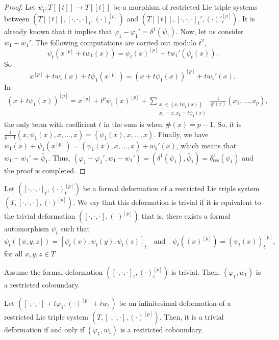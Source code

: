 \documentclass[11pt, twoside]{article}
\begin{document}
\begin{proof}
     Let $\psi_t:T[[t]] \to T[[t]] $ be a morphism of restricted Lie triple systems between $(T[[t]],[\cdot,\cdot,\cdot]_t,(\cdot)^{[p]}_t) $ and $(T[[t]],[\cdot,\cdot,\cdot]_t',(\cdot)'^{[p]}_t ) $. It is already known that it implies that $\varphi_1-\varphi_1'=\delta^1(\psi_1) $. Now, let us consider $w_1-w_1' $. The following computations are carried out modulo $t^2$, $$\psi_t(x^{[p]}+tw_1(x))= \psi_t(x)^{[p]}+tw_1'(\psi_t(x)). $$ So $$x^{[p]}+tw_1(x)+t\psi_1(x^{[p]})= (x+t\psi_1(x))^{[p]}+ tw_1'(x). $$ In \begin{align*}
        (x+t\psi_1(x))^{[p]}= x^{[p]}+ t^p\psi_1(x)^{[p]}+ \sum_{\substack{x_j\in \left\{x,t\psi_1(x) \right\}\\x_1=x,x_2=t\psi_1(x)}}\frac{1}{\#(x)}(x_1,\ldots,x_p),  
    \end{align*} the only term with coefficient $t$ in the sum is when $\#(x)=p-1 $. So, it is $\frac{1}{p-1}(x,\psi_1(x),x,\ldots,x)= (\psi_1(x),x,\ldots,x) $. Finally, we have $w_1(x)+\psi_1(x^{[p]})= (\psi_1(x),x,\ldots,x)+ w_1'(x) $, which means that $w_1-w_1'= \tilde{\psi_1} $. Thus, $(\varphi_1-\varphi_1',w_1-w_1') = (\delta^1(\psi_1),\tilde{\psi_1})=\delta_\mathrm{res}^1(\psi_1) $ and the proof is completed.
\end{proof}

\begin{defi}
    Let $([\cdot,\cdot,\cdot]_t,(\cdot)^{[p]}_t) $ be a formal deformation of a restricted Lie triple system $(T,[\cdot,\cdot,\cdot],(\cdot)^{[p]}) $. We say that this deformation is trivial if it is equivalent to the trivial deformation $([\cdot,\cdot,\cdot],(\cdot)^{[p]})$ that is, there exists a formal automorphism $\psi_t$ such that $$\psi_t([x,y,z])=[\psi_t(x),\psi_t(y),\psi_t(z)]_t \,\,\,\,\,\, \text{and} \,\,\,\,\,\, \psi_t((x)^{[p]})=(\psi_t(x))^{[p]}_t ,$$ for all $x,y,z\in T$.
\end{defi}

\begin{cor}
    Assume the formal deformation $([\cdot,\cdot,\cdot]_t,(\cdot)^{[p]}_t) $ is trivial. Then, $(\varphi_1,w_1) $ is a restricted coboundary.
\end{cor}

\begin{cor}
    Let $([\cdot,\cdot,\cdot]+t\varphi_1,(\cdot)^{[p]}+tw_1) $ be an infinitesimal deformation of a restricted Lie triple system $(T,[\cdot,\cdot,\cdot],(\cdot)^{[p]}) $. Then, it is a trivial deformation if and only if $(\varphi_1,w_1) $ is a restricted coboundary.
\end{cor}
\end{document}
